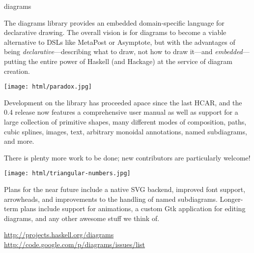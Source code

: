 \begin{hcarentry}[updated]{diagrams}
\makeheader

The diagrams library provides an embedded domain-specific language for
declarative drawing.  The overall vision is for diagrams to become a
viable alternative to DSLs like MetaPost or Asymptote, but with the
advantages of being \emph{declarative}---describing what to draw, not
how to draw it---and \emph{embedded}---putting the entire power of
Haskell (and Hackage) at the service of diagram creation.

\begin{center}
\texttt{[image: html/paradox.jpg]}
\end{center}

Development on the library has proceeded apace since the last HCAR,
and the 0.4 release now features a comprehensive user manual as well
as support for a large collection of primitive shapes, many different
modes of composition, paths, cubic splines, images, text, arbitrary
monoidal annotations, named subdiagrams, and more.

There is plenty more work to be done; new contributors are
particularly welcome!

\begin{center}
\texttt{[image: html/triangular-numbers.jpg]}
\end{center}

\FuturePlans

Plans for the near future include a native SVG backend, improved font
support, arrowheads, and improvements to the handling of named
subdiagrams.  Longer-term plans include support for animations, a
custom Gtk application for editing diagrams, and any other awesome
stuff we think of.

\FurtherReading
\url{http://projects.haskell.org/diagrams}
\url{http://code.google.com/p/diagrams/issues/list}
\end{hcarentry}
